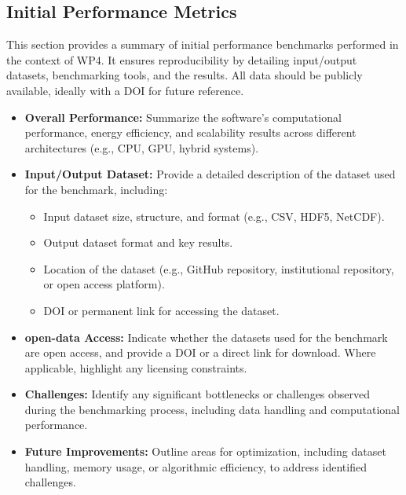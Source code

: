 \subsection{Initial Performance Metrics}
\label{sec:WP4:Hawen:metrics}

This section provides a summary of initial performance benchmarks performed in the context of WP4. It ensures reproducibility by detailing input/output datasets, benchmarking tools, and the results. All data should be publicly available, ideally with a DOI for future reference.

\begin{itemize}
    \item \textbf{Overall Performance:} Summarize the software's computational performance, energy efficiency, and scalability results across different architectures (e.g., CPU, GPU, hybrid systems).
    \item \textbf{Input/Output Dataset:} Provide a detailed description of the dataset used for the benchmark, including:
        \begin{itemize}
            \item Input dataset size, structure, and format (e.g., CSV, HDF5, NetCDF).
            \item Output dataset format and key results.
            \item Location of the dataset (e.g., GitHub repository, institutional repository, or open access platform).
            \item DOI or permanent link for accessing the dataset.
        \end{itemize}
    \item \textbf{open-data Access:} Indicate whether the datasets used for the benchmark are open access, and provide a DOI or a direct link for download. Where applicable, highlight any licensing constraints.
    \item \textbf{Challenges:} Identify any significant bottlenecks or challenges observed during the benchmarking process, including data handling and computational performance.
    \item \textbf{Future Improvements:} Outline areas for optimization, including dataset handling, memory usage, or algorithmic efficiency, to address identified challenges.
\end{itemize}

